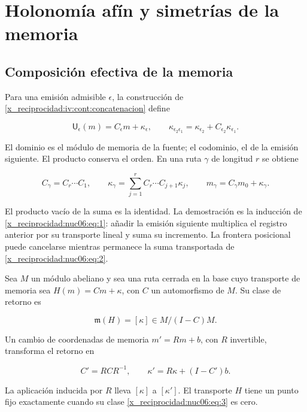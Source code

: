 \chapter{Holonomía afín y simetrías de la memoria}
\label{x_reciprocidad:nuclear:6}
\section{Composición efectiva de la memoria}

Para una emisión admisible \(\epsilon\), la construcción de \cref{x_reciprocidad:iv:cont:concatenacion} define

\begin{equation}
\mathsf U_\epsilon(m)=C_\epsilon m+\kappa_\epsilon,
\qquad
\kappa_{\epsilon_2\epsilon_1}
=\kappa_{\epsilon_2}+C_{\epsilon_2}\kappa_{\epsilon_1}.
\label{x_reciprocidad:nuc06:eq:1}
\end{equation}

El dominio es el módulo de memoria de la fuente; el codominio, el de la emisión siguiente. El producto conserva el orden. En una ruta \(\gamma\) de longitud \(r\) se obtiene

\begin{equation}
C_\gamma=C_r\cdots C_1,\qquad
\kappa_\gamma=\sum_{j=1}^r C_r\cdots C_{j+1}\kappa_j,
\qquad
m_\gamma=C_\gamma m_0+\kappa_\gamma.
\label{x_reciprocidad:nuc06:eq:2}
\end{equation}

El producto vacío de la suma es la identidad. La demostración es la inducción de \eqref{x_reciprocidad:nuc06:eq:1}: añadir la emisión siguiente multiplica el registro anterior por su transporte lineal y suma su incremento. La frontera posicional puede cancelarse mientras permanece la suma transportada de \eqref{x_reciprocidad:nuc06:eq:2}.

\begin{proposition}

Sea \(M\) un módulo abeliano y sea una ruta cerrada en la base cuyo transporte de memoria sea \(H(m)=Cm+\kappa\), con \(C\) un automorfismo de \(M\). Su clase de retorno es

\begin{equation}
\mathfrak m(H)=[\kappa]\in M/(I-C)M.
\label{x_reciprocidad:nuc06:eq:3}
\end{equation}

Un cambio de coordenadas de memoria \(m'=Rm+b\), con \(R\) invertible, transforma el retorno en

\begin{equation}
C'=RCR^{-1},\qquad
\kappa'=R\kappa+(I-C')b.
\label{x_reciprocidad:nuc06:eq:4}
\end{equation}

La aplicación inducida por \(R\) lleva \([\kappa]\) a \([\kappa']\). El transporte \(H\) tiene un punto fijo exactamente cuando su clase \eqref{x_reciprocidad:nuc06:eq:3} es cero.
\end{proposition}

